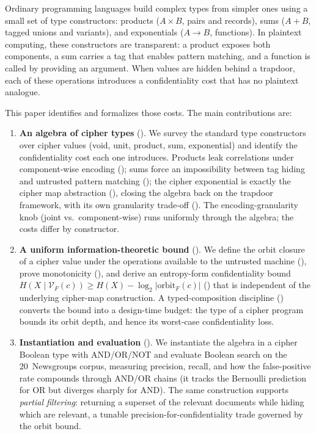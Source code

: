 \documentclass[11pt]{article}
\theoremstyle{definition}
\theoremstyle{plain}
\theoremstyle{remark}
\begin{document}
Ordinary programming languages build complex types from simpler ones
using a small set of type constructors: products ($A \times B$, pairs and
records), sums ($A + B$, tagged unions and variants), and exponentials
($A \to B$, functions).
In plaintext computing, these constructors are transparent: a product
exposes both components, a sum carries a tag that enables pattern matching,
and a function is called by providing an argument.
When values are hidden behind a trapdoor, each of these operations
introduces a confidentiality cost that has no plaintext analogue.

This paper identifies and formalizes those costs.
The main contributions are:

\begin{enumerate}
\item \textbf{An algebra of cipher types} ().
  We survey the standard type constructors over cipher values
  (void, unit, product, sum, exponential) and identify the
  confidentiality cost each one introduces.
  Products leak correlations under component-wise encoding
  (); sums force an impossibility
  between tag hiding and untrusted pattern matching
  (); the cipher exponential is
  exactly the cipher map abstraction
  (), closing the algebra back on
  the trapdoor framework, with its own granularity trade-off
  ().
  The encoding-granularity knob (joint vs.\ component-wise) runs
  uniformly through the algebra; the costs differ by constructor.

\item \textbf{A uniform information-theoretic bound} ().
  We define the orbit closure of a cipher value under the
  operations available to the untrusted machine
  (), prove monotonicity
  (), and derive an entropy-form
  confidentiality bound
  $H(X \mid \mathcal{V}_F(c)) \geq H(X) - \log_2 |\mathrm{orbit}_F(c)|$
  () that is independent of the
  underlying cipher-map construction.
  A typed-composition discipline () converts
  the bound into a design-time budget: the type of a cipher
  program bounds its orbit depth, and hence its worst-case
  confidentiality loss.

\item \textbf{Instantiation and evaluation} ().
  We instantiate the algebra in a cipher Boolean type with
  AND/OR/NOT and evaluate Boolean search on the 20~Newsgroups corpus,
  measuring precision, recall, and how the false-positive rate compounds
  through AND/OR chains (it tracks the Bernoulli prediction for OR but
  diverges sharply for AND).
  The same construction supports \emph{partial filtering}: returning a
  superset of the relevant documents while hiding which are relevant,
  a tunable precision-for-confidentiality trade governed by the orbit
  bound.
\end{enumerate}
\end{document}
